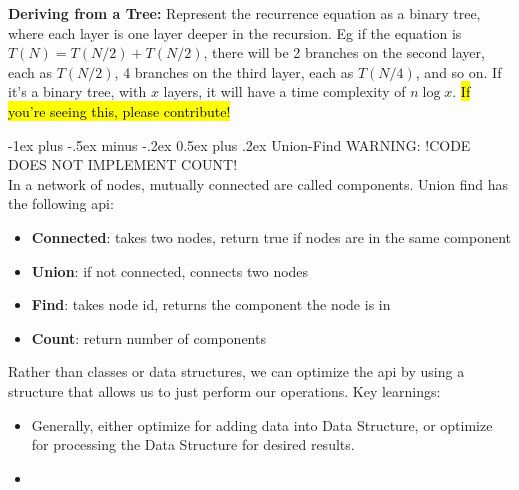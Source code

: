 \documentclass[letterpaper, 8pt]{extarticle}
\makeatletter
\renewcommand{\section}{\@startsection{section}{1}{0mm}%
                                {-1ex plus -.5ex minus -.2ex}%
                                {0.5ex plus .2ex}%
                                {\normalfont\normalsize\bfseries}}
\makeatother
\begin{document}
\begin{multicols*}{4}

  \textbf{Deriving from a Tree:}
  Represent the recurrence equation as a binary tree,
  where each layer is one layer deeper in the recursion.
  Eg if the equation is $T(N) = T(N/2) + T(N/2)$,
  there will be 2 branches on the second layer, each as $T(N/2)$,
  4 branches on the third layer, each as $T(N/4)$, and so on.
  If it's a binary tree, with $x$ layers,
  it will have a time complexity of $n \log x$.
  \hl{If you're seeing this, please contribute!}

  \section{Union-Find}
  WARNING: !CODE DOES NOT IMPLEMENT COUNT! \\
  In a network of nodes, mutually connected are called components. Union find has the following api:
  \begin{itemize}
    \item \textbf{Connected}: takes two nodes, return true if nodes are in the same component
    \item \textbf{Union}: if not connected, connects two nodes
    \item \textbf{Find}: takes node id, returns the component the node is in
    \item \textbf{Count}: return number of components
  \end{itemize}
  Rather than classes or data structures, we can optimize the api by using a structure that allows us to just perform our operations.
  Key learnings:
  \begin{itemize}
    \item Generally, either optimize for adding data into Data Structure,
          or optimize for processing the Data Structure for desired results.

    \item
  \end{itemize}


\end{multicols*}
\end{document}
